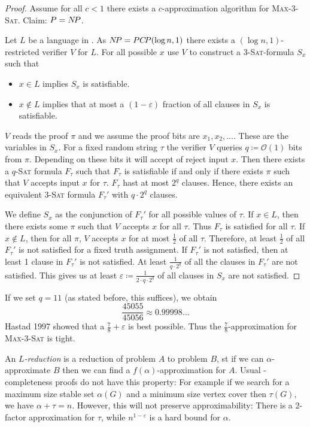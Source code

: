 \documentclass[../skript.tex]{subfiles}
\begin{document}
\begin{proof}
Assume for all $c < 1$ there exists a $c$-approximation algorithm for \textsc{Max-3-Sat}. Claim: $P = N \! P$.

Let $L$ be a language in \NP. As $N \! P = PC \! P(\log n, 1)$ there exists a $(\log n, 1)$-restricted verifier $V$ for $L$.
For all possible $x$ use $V$ to construct a \textsc{3-Sat}-formula $S_x$ such that
\begin{itemize}
\item $x \in L$ implies $S_x$ is satisfiable.
\item $x \notin L$ implies that at most a $(1-\varepsilon)$ fraction of all clauses in $S_x$ is satisfiable.
\end{itemize}
$V$ reads the proof $\pi$ and we assume the proof bits are $x_1, x_2, \ldots$. These are the variables in $S_x$.
For a fixed random string $\tau$ the verifier $V$ queries $q \coloneqq \mathcal{O}(1)$ bits from $\pi$.
Depending on these bits it will accept of reject input $x$.
Then there exists a $q$\textsc{-Sat} formula $F_\tau$ such that $F_\tau$ is satisfiable if and only if there exists $\pi$ such that $V$ accepts input $x$ for $\tau$.
$F_\tau$ hast at most $2^q$ clauses. Hence, there exists an equivalent \textsc{3-Sat} formula $F_\tau'$ with $q \cdot 2^q$ clauses.

We define $S_x$ as the conjunction of $F_\tau'$ for all possible values of $\tau$.
If $x \in L$, then there exists some $\pi$ such that $V$ accepts $x$ for all $\tau$. Thus $F_\tau$ is satisfied for all $\tau$.
If $x \notin L$, then for all $\pi$, $V$ accepts $x$ for at most $\frac{1}{2}$ of all $\tau$. Therefore, at least $\frac{1}{2}$ of all $F_\tau'$ is not satisfied for a fixed truth assignment. If $F_\tau'$ is not satisfied, then at least 1 clause in $F_\tau'$ is not satisfied. At least $\frac{1}{q \cdot 2^q}$ of all the clauses in $F_\tau'$ are not satisfied.
This gives us at least $\varepsilon \coloneqq \frac{1}{2 \cdot q \cdot 2^q}$ of all clauses in $S_x$ are not satisfied.
\end{proof}
If we set $q = 11$ (as stated before, this suffices), we obtain
\[
	\frac{45055}{45056} \approx 0.99998\ldots
\]
Hastad \lbrack{}1997\rbrack{} showed that a $\frac{7}{8} + \varepsilon$ is best possible. Thus the $\frac{7}{8}$-approximation for \textsc{Max-3-Sat} is tight.

An \emph{$L$-reduction} is a reduction of problem $A$ to problem $B$, \ac{st} if we can $\alpha$-approximate $B$ then we can find a $f(\alpha)$-approximation for $A$.
Usual \NP-completeness proofs do not have this property: For example if we search for a maximum size stable set $\alpha(G)$ and a minimum size vertex cover then $\tau(G)$, we have $\alpha + \tau = n$. However, this will not preserve approximability: There is a 2-factor approximation for $\tau$, while $n^{1-\varepsilon}$ is a hard bound for $\alpha$.
\end{document}
